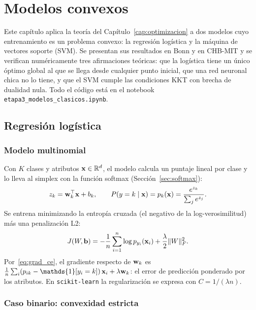 \chapter{Modelos convexos}
\label{cap:convexos}

Este capítulo aplica la teoría del Capítulo~\ref{cap:optimizacion} a dos modelos cuyo entrenamiento es un problema
convexo: la regresión logística y la máquina de vectores soporte (SVM). Se presentan sus resultados en Bonn y en
CHB-MIT y se verifican numéricamente tres afirmaciones teóricas: que la logística tiene un único óptimo global al que
se llega desde cualquier punto inicial, que una red neuronal chica no lo tiene, y que el SVM cumple las condiciones
KKT con brecha de dualidad nula. Todo el código está en el notebook \texttt{etapa3\_modelos\_clasicos.ipynb}.

\section{Regresión logística}
\label{sec:logistica}

\subsection{Modelo multinomial}

Con $K$ clases y atributos $\mathbf{x} \in \mathbb{R}^d$, el modelo calcula un puntaje lineal por clase y lo lleva al simplex con la
función softmax (Sección~\ref{sec:softmax}):
\begin{equation}
  z_k = \mathbf{w}_k^\top\mathbf{x} + b_k, \qquad P(y = k \mid \mathbf{x}) = p_k(\mathbf{x}) = \frac{e^{z_k}}{\sum_j e^{z_j}}.
\end{equation}
Se entrena minimizando la entropía cruzada (el negativo de la log-verosimilitud) más una penalización L2:
\begin{equation}
  J(W, \mathbf{b}) = -\frac1n\sum_{i=1}^n\log p_{y_i}(\mathbf{x}_i) + \frac{\lambda}{2}\lVert W\rVert_F^2.
  \label{eq:ce_multinomial}
\end{equation}
Por~\eqref{eq:grad_ce}, el gradiente respecto de $\mathbf{w}_k$ es $\frac1n\sum_i (p_{ik} - \mathds{1}[y_i = k])\,\vx_i + \lambda\vw_k$:
el error de predicción ponderado por los atributos. En \texttt{scikit-learn} la regularización se expresa con
$C = 1/(\lambda n)$.

\subsection{Caso binario: convexidad estricta}

